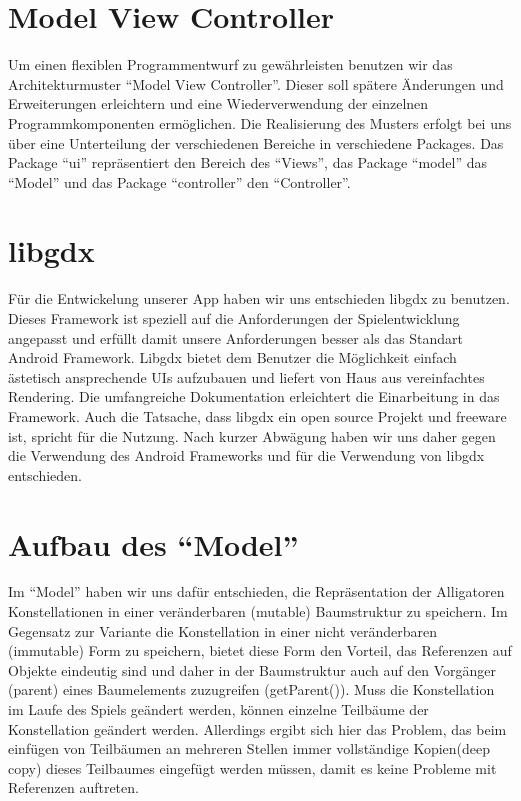 \section{Model View Controller}
Um einen flexiblen Programmentwurf zu gewährleisten benutzen wir das Architekturmuster "`Model View Controller"'.
Dieser soll spätere Änderungen und Erweiterungen erleichtern und eine Wiederverwendung der einzelnen Programmkomponenten ermöglichen.
Die Realisierung des Musters erfolgt bei uns über eine Unterteilung der verschiedenen Bereiche in verschiedene Packages.
 Das Package "`ui"' repräsentiert den Bereich des "`Views"', das Package "`model"' das "`Model"' und das Package "`controller"' den "`Controller"'.


\section{libgdx}
Für die Entwickelung unserer App haben wir uns entschieden libgdx zu benutzen.
 Dieses Framework ist speziell auf die Anforderungen der Spielentwicklung angepasst und erfüllt damit unsere Anforderungen besser als das Standart Android Framework.
 Libgdx bietet dem Benutzer die Möglichkeit einfach ästetisch ansprechende UIs aufzubauen und liefert von Haus aus vereinfachtes Rendering.
 Die umfangreiche Dokumentation erleichtert die
Einarbeitung in das Framework.
 Auch die Tatsache, dass libgdx ein open source Projekt und freeware ist, spricht für die Nutzung.
 Nach kurzer Abwägung haben wir uns daher gegen die Verwendung des Android Frameworks und für die Verwendung von libgdx entschieden.

\section{Aufbau des "`Model"'}
Im "`Model"' haben wir uns dafür entschieden, die Repräsentation der Alligatoren Konstellationen in einer veränderbaren (mutable) Baumstruktur zu speichern.
 Im Gegensatz zur Variante die Konstellation in einer nicht veränderbaren (immutable) Form zu speichern, bietet diese Form den Vorteil, das Referenzen auf Objekte eindeutig sind und daher in der Baumstruktur auch auf den Vorgänger (parent) eines Baumelements zuzugreifen (getParent()).
 Muss die Konstellation im Laufe des Spiels geändert werden, können einzelne Teilbäume der Konstellation geändert werden.
 Allerdings ergibt sich hier das Problem, das beim einfügen von Teilbäumen an mehreren Stellen immer vollständige Kopien(deep copy) dieses Teilbaumes eingefügt werden müssen, damit es keine Probleme mit Referenzen auftreten.

